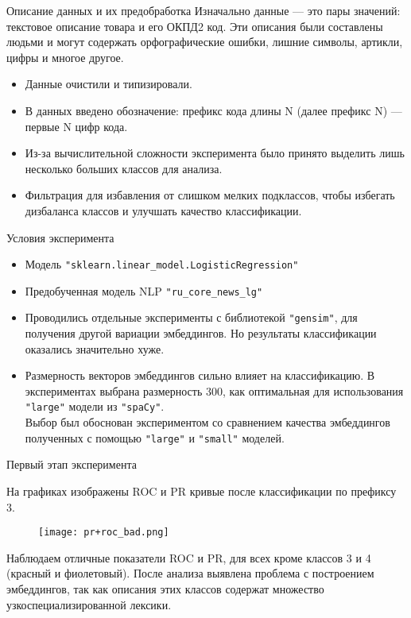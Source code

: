 \documentclass{beamer}
\begin{document}
\begin{frame}{Описание данных и их предобработка}
Изначально данные --- это пары значений: текстовое описание товара и его ОКПД2 код. Эти описания были составлены людьми и могут содержать орфографические ошибки, лишние символы, артикли, цифры и многое другое.
\begin{itemize}
\item Данные очистили и типизировали.
\item В данных введено обозначение: префикс кода длины N (далее префикс N) --- первые N цифр кода.
\item Из-за вычислительной сложности эксперимента было принято выделить лишь несколько больших классов для анализа. 
\item Фильтрация для избавления от слишком мелких подклассов, чтобы избегать дизбаланса классов и улучшать качество классификации.
\end{itemize}
\end{frame}
\begin{frame}{Условия эксперимента}
\begin{itemize}
    \item Модель \texttt{"sklearn.linear\_model.LogisticRegression"}
    \item Предобученная модель NLP \texttt{"ru\_core\_news\_lg"}
     \item Проводились отдельные эксперименты с библиотекой \texttt{"gensim"}, для получения другой вариации эмбеддингов. Но результаты классификации оказались значительно хуже.
    \item Размерность векторов эмбеддингов сильно влияет на классификацию. В экспериментах выбрана размерность 300, как оптимальная для использования \texttt{"large"} модели из \texttt{"spaCy"}. \\
    Выбор был обоснован экспериментом со сравнением качества эмбеддингов полученных с помощью \texttt{"large"} и \texttt{"small"} моделей.
\end{itemize}
\end{frame}




\begin{frame}{Первый этап эксперимента}

На графиках изображены ROC и PR кривые после классификации по префиксу 3.
\begin{figure}[!h]
\centering
\texttt{[image: pr+roc\_bad.png]}
\end{figure}
Наблюдаем отличные показатели ROC и PR, для всех кроме классов 3 и 4 (красный и фиолетовый). После анализа выявлена проблема с построением эмбеддингов, так как описания этих классов содержат множество узкоспециализированной лексики.
\end{frame}
\end{document}
